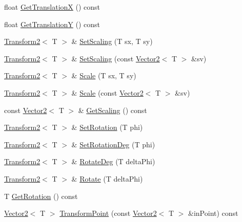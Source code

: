 \begin{DoxyCompactItemize}
\item 
float \hyperlink{classastu_1_1Transform2_a065f89d4c5cca423963d466566ec56ff}{Get\+TranslationX} () const
\item 
float \hyperlink{classastu_1_1Transform2_a731d0cb4c4a249b5f42a672f42b04a3b}{Get\+TranslationY} () const
\item 
\hyperlink{classastu_1_1Transform2}{Transform2}$<$ T $>$ \& \hyperlink{classastu_1_1Transform2_ab9c1a74b0111dd0fe1d98d05c494c6fa}{Set\+Scaling} (T sx, T sy)
\item 
\hyperlink{classastu_1_1Transform2}{Transform2}$<$ T $>$ \& \hyperlink{classastu_1_1Transform2_a39e88567ba54548929588d86bc42a37c}{Set\+Scaling} (const \hyperlink{classastu_1_1Vector2}{Vector2}$<$ T $>$ \&sv)
\item 
\hyperlink{classastu_1_1Transform2}{Transform2}$<$ T $>$ \& \hyperlink{classastu_1_1Transform2_a0751a24e9f7240bf5e0e9232e50ff98c}{Scale} (T sx, T sy)
\item 
\hyperlink{classastu_1_1Transform2}{Transform2}$<$ T $>$ \& \hyperlink{classastu_1_1Transform2_a776970c69186667e1dad8a8815f29703}{Scale} (const \hyperlink{classastu_1_1Vector2}{Vector2}$<$ T $>$ \&sv)
\item 
const \hyperlink{classastu_1_1Vector2}{Vector2}$<$ T $>$ \& \hyperlink{classastu_1_1Transform2_ae2849a93a92f6f85ab2545e107f8d66f}{Get\+Scaling} () const
\item 
\hyperlink{classastu_1_1Transform2}{Transform2}$<$ T $>$ \& \hyperlink{classastu_1_1Transform2_abdbbea459157f3ec8487dd1f1779d174}{Set\+Rotation} (T phi)
\item 
\hyperlink{classastu_1_1Transform2}{Transform2}$<$ T $>$ \& \hyperlink{classastu_1_1Transform2_a1ace92a6ad298fcae2de3c113135f903}{Set\+Rotation\+Deg} (T phi)
\item 
\hyperlink{classastu_1_1Transform2}{Transform2}$<$ T $>$ \& \hyperlink{classastu_1_1Transform2_a556a2918222c36c8e47735640b2335f8}{Rotate\+Deg} (T delta\+Phi)
\item 
\hyperlink{classastu_1_1Transform2}{Transform2}$<$ T $>$ \& \hyperlink{classastu_1_1Transform2_a03ad8a715f9d9ba348872998bb2b8dbd}{Rotate} (T delta\+Phi)
\item 
T \hyperlink{classastu_1_1Transform2_a91764fcfd6b5213ede2168ce661ce364}{Get\+Rotation} () const
\item 
\hyperlink{classastu_1_1Vector2}{Vector2}$<$ T $>$ \hyperlink{classastu_1_1Transform2_a1ba0bffb65372e61791f24c1d2edb60a}{Transform\+Point} (const \hyperlink{classastu_1_1Vector2}{Vector2}$<$ T $>$ \&in\+Point) const

\end{DoxyCompactItemize}
